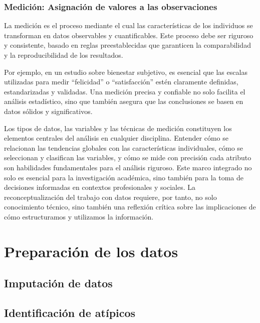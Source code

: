 \documentclass[
  letterpaper,
  DIV=11,
  numbers=noendperiod]{scrreprt}
\begin{document}
\subsection{Medición: Asignación de valores a las
observaciones}\label{mediciuxf3n-asignaciuxf3n-de-valores-a-las-observaciones}

La medición es el proceso mediante el cual las características de los
individuos se transforman en datos observables y cuantificables. Este
proceso debe ser riguroso y consistente, basado en reglas
preestablecidas que garanticen la comparabilidad y la reproducibilidad
de los resultados.

Por ejemplo, en un estudio sobre bienestar subjetivo, es esencial que
las escalas utilizadas para medir ``felicidad'' o ``satisfacción'' estén
claramente definidas, estandarizadas y validadas. Una medición precisa y
confiable no solo facilita el análisis estadístico, sino que también
asegura que las conclusiones se basen en datos sólidos y significativos.

Los tipos de datos, las variables y las técnicas de medición constituyen
los elementos centrales del análisis en cualquier disciplina. Entender
cómo se relacionan las tendencias globales con las características
individuales, cómo se seleccionan y clasifican las variables, y cómo se
mide con precisión cada atributo son habilidades fundamentales para el
análisis riguroso. Este marco integrado no solo es esencial para la
investigación académica, sino también para la toma de decisiones
informadas en contextos profesionales y sociales. La reconceptualización
del trabajo con datos requiere, por tanto, no solo conocimiento técnico,
sino también una reflexión crítica sobre las implicaciones de cómo
estructuramos y utilizamos la información.

\chapter{Preparación de los datos}\label{preparaciuxf3n-de-los-datos}

\section{Imputación de datos}\label{imputaciuxf3n-de-datos}

\section{Identificación de
atípicos}\label{identificaciuxf3n-de-atuxedpicos}
\end{document}

